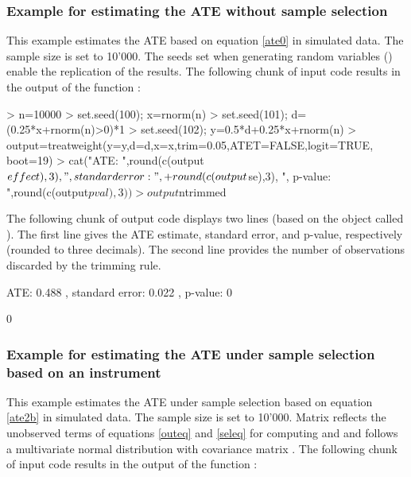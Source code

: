 \documentclass[nojss]{jss}
\begin{document}
\subsubsection{Example for estimating the ATE without sample selection}\label{exsel1}

This example estimates the ATE based on equation \eqref{ate0} in simulated data. The sample size  is set to 10'000. The seeds set when generating random variables () enable the replication of the results. The following chunk of  input code results in the output of the function :


\begin{Schunk}
\begin{Sinput}
> n=10000
> set.seed(100); x=rnorm(n)
> set.seed(101); d=(0.25*x+rnorm(n)>0)*1
> set.seed(102); y=0.5*d+0.25*x+rnorm(n)
> output=treatweight(y=y,d=d,x=x,trim=0.05,ATET=FALSE,logit=TRUE, boot=19)
> cat("ATE: ",round(c(output$effect),3),", standard error: ",
+     round(c(output$se),3), ", p-value: ",round(c(output$pval),3))
> output$ntrimmed
\end{Sinput}
\end{Schunk}

The following chunk of output code displays two lines (based on the  object called ). The first line gives the ATE estimate, standard error, and p-value, respectively (rounded to three decimals). The second line provides the number of observations discarded by the trimming rule.

\begin{Schunk}
\begin{Soutput}
ATE:  0.488 , standard error:  0.022 , p-value:  0
\end{Soutput}
\begin{Soutput}
[1] 0
\end{Soutput}
\end{Schunk}

\subsubsection{Example for estimating the ATE under sample selection based on an instrument}\label{exsel2}

This example estimates the ATE under sample selection based on equation \eqref{ate2b} in simulated data. The sample size  is set to 10'000. Matrix  reflects the unobserved terms of equations \eqref{outeq} and \eqref{seleq} for computing  and  and follows a multivariate normal distribution with covariance matrix . The following chunk of  input code results in the output of the function :
\end{document}
